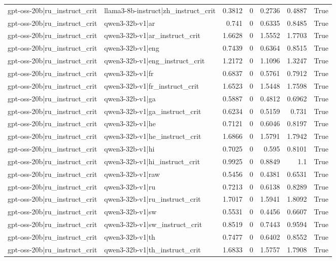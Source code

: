 \begin{table}
\begin{tabular}{l l r r r r l}
gpt-oss-20b|ru_instruct_crit & llama3-8b-instruct|zh_instruct_crit & 0.3812 & 0 & 0.2736 & 0.4887 & True \\
gpt-oss-20b|ru_instruct_crit & qwen3-32b-v1|ar & 0.741 & 0 & 0.6335 & 0.8485 & True \\
gpt-oss-20b|ru_instruct_crit & qwen3-32b-v1|ar_instruct_crit & 1.6628 & 0 & 1.5552 & 1.7703 & True \\
gpt-oss-20b|ru_instruct_crit & qwen3-32b-v1|eng & 0.7439 & 0 & 0.6364 & 0.8515 & True \\
gpt-oss-20b|ru_instruct_crit & qwen3-32b-v1|eng_instruct_crit & 1.2172 & 0 & 1.1096 & 1.3247 & True \\
gpt-oss-20b|ru_instruct_crit & qwen3-32b-v1|fr & 0.6837 & 0 & 0.5761 & 0.7912 & True \\
gpt-oss-20b|ru_instruct_crit & qwen3-32b-v1|fr_instruct_crit & 1.6523 & 0 & 1.5448 & 1.7598 & True \\
gpt-oss-20b|ru_instruct_crit & qwen3-32b-v1|ga & 0.5887 & 0 & 0.4812 & 0.6962 & True \\
gpt-oss-20b|ru_instruct_crit & qwen3-32b-v1|ga_instruct_crit & 0.6234 & 0 & 0.5159 & 0.731 & True \\
gpt-oss-20b|ru_instruct_crit & qwen3-32b-v1|he & 0.7121 & 0 & 0.6046 & 0.8197 & True \\
gpt-oss-20b|ru_instruct_crit & qwen3-32b-v1|he_instruct_crit & 1.6866 & 0 & 1.5791 & 1.7942 & True \\
gpt-oss-20b|ru_instruct_crit & qwen3-32b-v1|hi & 0.7025 & 0 & 0.595 & 0.8101 & True \\
gpt-oss-20b|ru_instruct_crit & qwen3-32b-v1|hi_instruct_crit & 0.9925 & 0 & 0.8849 & 1.1 & True \\
gpt-oss-20b|ru_instruct_crit & qwen3-32b-v1|raw & 0.5456 & 0 & 0.4381 & 0.6531 & True \\
gpt-oss-20b|ru_instruct_crit & qwen3-32b-v1|ru & 0.7213 & 0 & 0.6138 & 0.8289 & True \\
gpt-oss-20b|ru_instruct_crit & qwen3-32b-v1|ru_instruct_crit & 1.7017 & 0 & 1.5941 & 1.8092 & True \\
gpt-oss-20b|ru_instruct_crit & qwen3-32b-v1|sw & 0.5531 & 0 & 0.4456 & 0.6607 & True \\
gpt-oss-20b|ru_instruct_crit & qwen3-32b-v1|sw_instruct_crit & 0.8519 & 0 & 0.7443 & 0.9594 & True \\
gpt-oss-20b|ru_instruct_crit & qwen3-32b-v1|th & 0.7477 & 0 & 0.6402 & 0.8552 & True \\
gpt-oss-20b|ru_instruct_crit & qwen3-32b-v1|th_instruct_crit & 1.6833 & 0 & 1.5757 & 1.7908 & True \\

\end{tabular}
\end{table}
